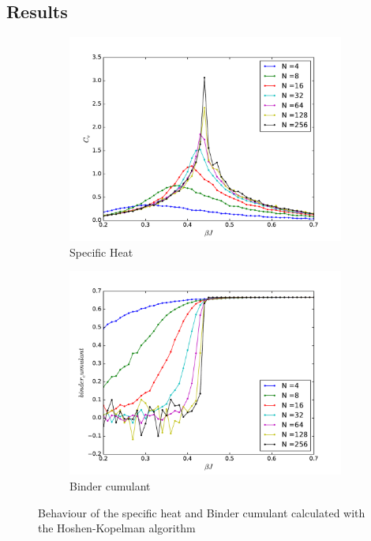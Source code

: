 \documentclass[twoside]{article}
\begin{document}
\begin{multicols}{2}

\section{Results}

\begin{figure}[t] 
 \begin{subfigure}[b]{0.35\textwidth}
    \includegraphics[width=\textwidth]{images/cv.pdf}
    \caption{Specific Heat}
    \label{cv}
  \end{subfigure}
  \begin{subfigure}[b]{0.35\textwidth}
    \includegraphics[width=\textwidth]{images/binder_cumulant.pdf}
    \caption{Binder cumulant}
    \label{bc}
  \end{subfigure}
  \caption{Behaviour of the specific heat and Binder cumulant calculated with the Hoshen-Kopelman algorithm}
\end{figure}


\end{multicols}
\end{document}
